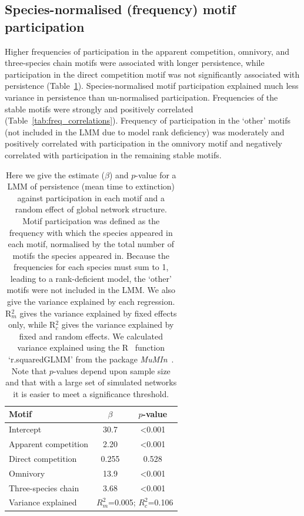 \documentclass[12pt]{article}
\begin{document}
\begin{spacing}{2.0}
	\subsection*{Species-normalised (frequency) motif participation}

		Higher frequencies of participation in the apparent competition, omnivory, and three-species chain motifs were associated with longer persistence, while participation in the direct competition motif was not significantly associated with persistence (Table~\ref{tab:persistence_freq}).
		Species-normalised motif participation explained much less variance in persistence than un-normalised participation.
		Frequencies of the stable motifs were strongly and positively correlated (Table~\ref{tab:freq_correlations}).
		Frequency of participation in the `other' motifs (not included in the LMM due to model rank deficiency) was moderately and positively correlated with participation in the omnivory motif and negatively correlated with participation in the remaining stable motifs.


		\begin{table}[hb!]
    		\caption{Here we give the estimate ($\beta$) and $p$-value for a LMM of persistence (mean time to extinction) against participation in each motif and a random effect of global network structure. Motif participation was defined as the frequency with which the species appeared in each motif, normalised by the total number of motifs the species appeared in. Because the frequencies for each species must sum to 1, leading to a rank-deficient model, the `other' motifs were not included in the LMM. We also give the variance explained by each regression. R$^{2}_{m}$ gives the variance explained by fixed effects only, while R$^{2}_{c}$ gives the variance explained by fixed and random effects. We calculated variance explained using the R~\citep{R} function `r.squaredGLMM' from the package \emph{MuMIn}~\citep{MuMIn}. Note that $p$-values depend upon sample size and that with a large set of simulated networks it is easier to meet a significance threshold.}
    		\label{tab:persistence_freq}
    		\begin{tabular}{l | c c}
    		 Motif & $\beta$ & $p$-value \\  
    		 \hline
    		 Intercept & 30.7 & \textless0.001 \\
    		 \hline
    		 Apparent competition & 2.20 & \textless0.001 \\
    		 Direct competition & 0.255 & 0.528 \\
    		 Omnivory & 13.9 & \textless0.001 \\
    		 Three-species chain & 3.68 & \textless0.001 \\
    		 \hline
    		 Variance explained & \multicolumn{2}{c}{$R^{2}_m$=0.005; $R^{2}_c$=0.106} \\
    		 \hline
    		 \end{tabular}
    		 \end{table}



\end{spacing}
\end{document}
